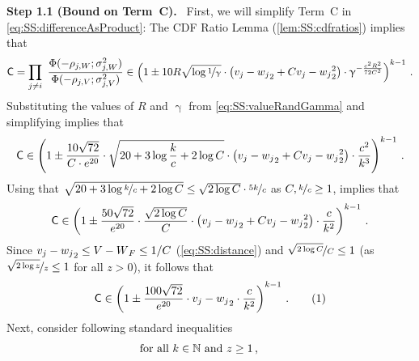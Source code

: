 \documentclass[11pt,letterpaper]{article}
\theoremstyle{plain}
\theoremstyle{definition}
\theoremstyle{remark}
\newcommand{\yesnum}{\addtocounter{equation}{1}\tag{\theequation}}
\newcommand{\sinparen}[1]{\ensuremath{(#1)}}
\newcommand{\inparen}[1]{\ensuremath{\left(#1\right)}}
\let\norm\relax
\newcommand{\norm}[1]{\ensuremath{\left\lVert #1 \right\rVert}}
\newcommand{\N}{\mathbb{N}}
\newcommand{\nfrac}[2]{\nicefrac{#1}{#2}}
\renewcommand{\paragraph}[1]{\medskip \noindent\textbf{#1}~}
\renewcommand{\gamma}{\upgamma}
\newcommand{\customcdf}[2]{\Phi\sinparen{#1; \sigma_{#2}^2}}
\newcommand{\proofconstant}{{3}}
\begin{document}
{{    \paragraph{Step 1.1 (Bound on Term~\textsf{C}).}
    First, we will simplify Term~\textsf{C} in \cref{eq:SS:differenceAsProduct}:
    The CDF Ratio Lemma (\cref{lem:SS:cdfratios}) implies that 
    \begin{align*}
        \textsf{C} 
        =
            \prod_{j\neq i}~ \frac{
                \customcdf{-\rho_{j,W}}{j,W}
            }{
                \customcdf{-\rho_{j,V}}{j,V}
        }
        \in
        \inparen{
            1
                \pm 10R\sqrt{\log{\nfrac{1}{\gamma}}}\cdot 
                \inparen{\norm{v_j-w_j}_2+C\norm{v_j-w_j}_2^2}
                \cdot \gamma^{-\frac{c^2R^2}{72C^2}}
        }^{k-1}
        \,.
    \end{align*}
    Substituting the values of $R$ and $\gamma$ from \cref{eq:SS:valueRandGamma} and simplifying implies that 
    \[
        \textsf{C} 
        \in
        \inparen{
            1
                \pm \frac{10\sqrt{72}}{C\cdot e^{20}}
                    \cdot 
                    \sqrt{
                        20 + 3\log{\frac{k}{c}}
                        +2 \log{C}
                    } 
                \cdot 
                \inparen{\norm{v_j-w_j}_2+C\norm{v_j-w_j}_2^2}
                \cdot {\frac{c^{2}}{k^{\proofconstant{}}}}
        }^{k-1}\,.
    \]
    Using that $\sqrt{20+3\log{\nfrac{k}{c}}+2\log{C}}\leq \sqrt{2\log{C}}\cdot \nfrac{5k}{c}$ as $C,\nfrac{k}{c}\geq 1$,  implies that 
    \[
        \textsf{C} 
        \in
        \inparen{
            1
                \pm \frac{50\sqrt{72}}{e^{20}}
                \cdot 
                \frac{\sqrt{2\log{C}}}{C}\cdot
                \inparen{\norm{v_j-w_j}_2+C\norm{v_j-w_j}_2^2}
                \cdot {\frac{c}{k^{2}}}
        }^{k-1}\,.
    \]
    Since $\norm{v_j-w_j}_2\leq \norm{V-W}_F\leq 1/C$ (\cref{eq:SS:distance}) and $\nfrac{\sqrt{2\log{C}}}{C}\leq 1$ (as $\nfrac{\sqrt{2\log{z}}}{z}\leq 1$ for all $z>0$), it follows that 
    \[
        \textsf{C} 
        \in
        \inparen{
            1
                \pm \frac{100\sqrt{72}}{e^{20}} 
                \cdot 
                \norm{v_j-w_j}_2
                \cdot {\frac{c}{k^{2}}}
        }^{k-1}\,.
        \yesnum\label{eq:SS:termC}
    \]
    Next, consider following standard inequalities 
    \begin{align*}
        \begin{split}
            \text{for all $k\in \N$ and $z\geq 1$\,,}\qquad 

\end{split}
\end{align*}}}
\end{document}
